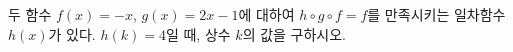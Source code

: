 두 함수 $f(x)=-x$, $g(x)=2x-1$에 대하여 $h\circ g\circ f=f$를 만족시키는 일차함수 $h(x)$가 있다. $h(k)=4$일 때, 상수 $k$의 값을 구하시오.
